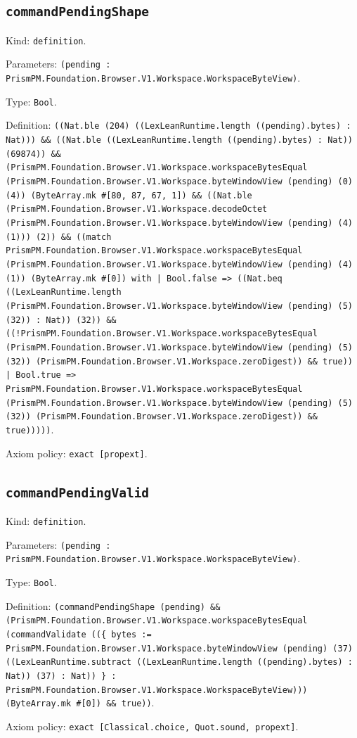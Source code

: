 \documentclass[11pt]{article}
\begin{document}
\subsection*{\texttt{commandPendingShape}}
\noindent Kind: \texttt{definition}.\par
\noindent Parameters: \texttt{(pending : PrismPM.Foundation.Browser.V1.Workspace.WorkspaceByteView)}.\par
\noindent Type: \texttt{Bool}.\par
\noindent Definition: \texttt{((Nat.ble (204) ((LexLeanRuntime.length ((pending).bytes) : Nat))) \&\& ((Nat.ble ((LexLeanRuntime.length ((pending).bytes) : Nat)) (69874)) \&\& (PrismPM.Foundation.Browser.V1.Workspace.workspaceBytesEqual (PrismPM.Foundation.Browser.V1.Workspace.byteWindowView (pending) (0) (4)) (ByteArray.mk \#[80, 87, 67, 1]) \&\& ((Nat.ble (PrismPM.Foundation.Browser.V1.Workspace.decodeOctet (PrismPM.Foundation.Browser.V1.Workspace.byteWindowView (pending) (4) (1))) (2)) \&\& ((match PrismPM.Foundation.Browser.V1.Workspace.workspaceBytesEqual (PrismPM.Foundation.Browser.V1.Workspace.byteWindowView (pending) (4) (1)) (ByteArray.mk \#[0]) with | Bool.false => ((Nat.beq ((LexLeanRuntime.length (PrismPM.Foundation.Browser.V1.Workspace.byteWindowView (pending) (5) (32)) : Nat)) (32)) \&\& ((!PrismPM.Foundation.Browser.V1.Workspace.workspaceBytesEqual (PrismPM.Foundation.Browser.V1.Workspace.byteWindowView (pending) (5) (32)) (PrismPM.Foundation.Browser.V1.Workspace.zeroDigest)) \&\& true)) | Bool.true => PrismPM.Foundation.Browser.V1.Workspace.workspaceBytesEqual (PrismPM.Foundation.Browser.V1.Workspace.byteWindowView (pending) (5) (32)) (PrismPM.Foundation.Browser.V1.Workspace.zeroDigest)) \&\& true)))))}.\par
\noindent Axiom policy: \texttt{exact [propext]}.\par
\subsection*{\texttt{commandPendingValid}}
\noindent Kind: \texttt{definition}.\par
\noindent Parameters: \texttt{(pending : PrismPM.Foundation.Browser.V1.Workspace.WorkspaceByteView)}.\par
\noindent Type: \texttt{Bool}.\par
\noindent Definition: \texttt{(commandPendingShape (pending) \&\& (PrismPM.Foundation.Browser.V1.Workspace.workspaceBytesEqual (commandValidate ((\{ bytes := PrismPM.Foundation.Browser.V1.Workspace.byteWindowView (pending) (37) ((LexLeanRuntime.subtract ((LexLeanRuntime.length ((pending).bytes) : Nat)) (37) : Nat)) \} : PrismPM.Foundation.Browser.V1.Workspace.WorkspaceByteView))) (ByteArray.mk \#[0]) \&\& true))}.\par
\noindent Axiom policy: \texttt{exact [Classical.choice, Quot.sound, propext]}.\par
\end{document}

